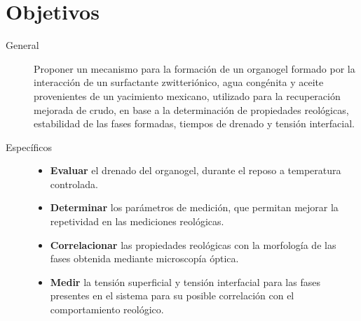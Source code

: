 \section{Objetivos}
\begin{description}
\item[General] Proponer un mecanismo para la formación de un organogel formado por la interacción de un surfactante zwitteriónico, agua congénita y aceite provenientes de un yacimiento mexicano, utilizado para la recuperación mejorada de crudo, en base a la determinación de propiedades reológicas, estabilidad de las fases formadas, tiempos de drenado y tensión interfacial.

\clearpage

\item[Específicos] \hfill
  \begin{itemize}
    \item \textbf{Evaluar} el drenado del organogel, durante el reposo a temperatura controlada.
    \item \textbf{Determinar} los parámetros de medición, que permitan mejorar la repetividad en las mediciones reológicas.
    \item \textbf{Correlacionar} las propiedades reológicas con la morfología de las fases obtenida mediante microscopía óptica. 
    \item \textbf{Medir} la tensión superficial y tensión interfacial para las fases presentes en el sistema para su posible correlación con el comportamiento reológico.
  \end{itemize}
 
 
\end{description}
%
